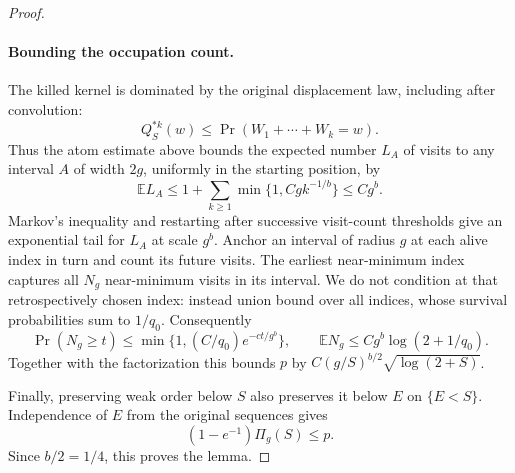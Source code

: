 \documentclass[11pt]{article}
\numberwithin{equation}{section}
\theoremstyle{definition}\newtheorem{definition}[theorem]{Definition}
\theoremstyle{remark}\newtheorem{remark}[theorem]{Remark}
\begin{document}
\begin{proof}
\paragraph{Bounding the occupation count.}
The killed kernel is dominated by the original displacement law, including
after convolution:
\[
 Q_S^{*k}(w)\le\Pr(W_1+\cdots+W_k=w).
\]
Thus the atom estimate above bounds the expected number $L_A$ of visits
to any interval $A$ of width $2g$, uniformly in the starting position, by
\[
 \mathbb E L_A\le 1+\sum_{k\ge1}\min\{1,Cgk^{-1/b}\}
 \le Cg^b.
\]
Markov's inequality and restarting after successive visit-count thresholds
give an exponential tail for $L_A$ at scale $g^b$. Anchor an interval of
radius $g$ at each alive index in turn and count its future visits. The
earliest near-minimum index captures all $N_g$ near-minimum visits in its
interval. We do not condition at that retrospectively chosen index:
instead union bound over all indices, whose survival probabilities sum to
$1/q_0$. Consequently
\[
 \Pr(N_g\ge t)\le
 \min\{1,(C/q_0)e^{-ct/g^b}\},\qquad
 \mathbb E N_g\le Cg^b\log(2+1/q_0).
\]
Together with the factorization this bounds $p$ by
$C(g/S)^{b/2}\sqrt{\log(2+S)}$.

Finally, preserving weak order below $S$ also preserves it below $E$ on
$\{E<S\}$. Independence of $E$ from the original sequences gives
\[
 (1-e^{-1})\Pi_g(S)\le p.
\]
Since $b/2=1/4$, this proves the lemma.
\end{proof}
\end{document}
